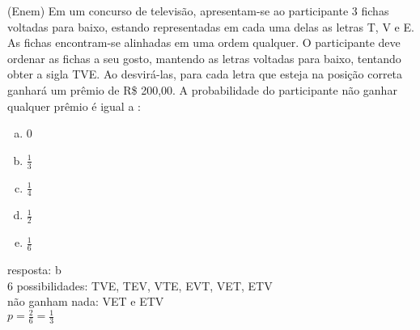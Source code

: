 \begin{ex}
 (Enem) Em um concurso de televisão, apresentam-se ao participante 3 fichas voltadas para baixo, estando representadas em cada uma delas as letras T, V e E. As fichas encontram-se alinhadas em uma ordem qualquer. O participante deve ordenar as fichas a seu gosto, mantendo as letras voltadas para baixo, tentando obter a sigla TVE. Ao desvirá-las, para cada letra que esteja na posição correta ganhará um prêmio de R\$ 200,00. A probabilidade do participante não ganhar qualquer prêmio é igual a :
    \begin{enumerate}[(a)]
    \item 0
    \item $\frac{1}{3}$
    \item $\frac{1}{4}$
    \item $\frac{1}{2}$
    \item $\frac{1}{6}$
    \end{enumerate}
      \begin{sol}
        resposta: b \\
        6 possibilidades: TVE, TEV, VTE, EVT, VET, ETV \\
        não ganham nada: VET e ETV \\
        $p=\frac{2}{6}=\frac{1}{3}$
      \end{sol}
\end{ex}